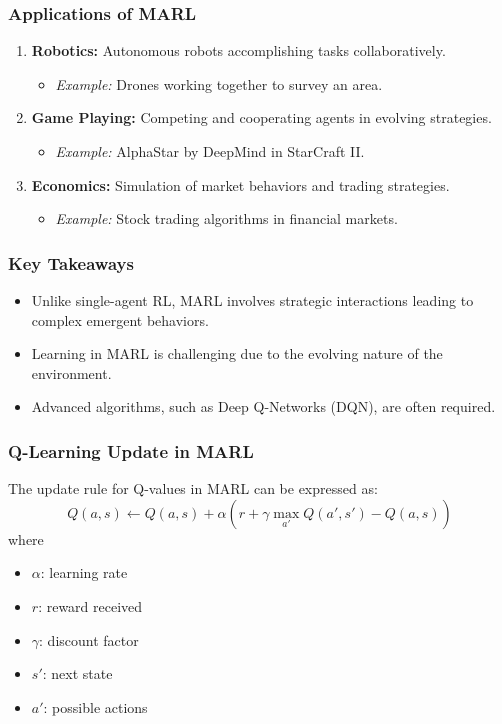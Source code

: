\documentclass[aspectratio=169]{beamer}
\begin{document}
\begin{frame}[fragile]
    \frametitle{Applications of MARL}
    \begin{enumerate}
        \item \textbf{Robotics:} Autonomous robots accomplishing tasks collaboratively.
        \begin{itemize}
            \item \textit{Example:} Drones working together to survey an area.
        \end{itemize}
        \item \textbf{Game Playing:} Competing and cooperating agents in evolving strategies.
        \begin{itemize}
            \item \textit{Example:} AlphaStar by DeepMind in StarCraft II.
        \end{itemize}
        \item \textbf{Economics:} Simulation of market behaviors and trading strategies.
        \begin{itemize}
            \item \textit{Example:} Stock trading algorithms in financial markets.
        \end{itemize}
    \end{enumerate}
\end{frame}

\begin{frame}[fragile]
    \frametitle{Key Takeaways}
    \begin{itemize}
        \item Unlike single-agent RL, MARL involves strategic interactions leading to complex emergent behaviors.
        \item Learning in MARL is challenging due to the evolving nature of the environment.
        \item Advanced algorithms, such as Deep Q-Networks (DQN), are often required.
    \end{itemize}
\end{frame}

\begin{frame}[fragile]
    \frametitle{Q-Learning Update in MARL}
    The update rule for Q-values in MARL can be expressed as:
    \begin{equation}
        Q(a,s) \leftarrow Q(a,s) + \alpha \left( r + \gamma \max_{a'} Q(a',s') - Q(a,s) \right)
    \end{equation}
    where 
    \begin{itemize}
        \item \( \alpha \): learning rate
        \item \( r \): reward received
        \item \( \gamma \): discount factor
        \item \( s' \): next state
        \item \( a' \): possible actions
    \end{itemize}
\end{frame}
\end{document}
